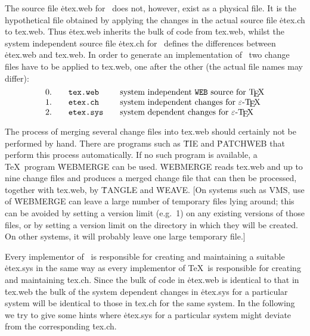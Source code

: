 The source file \.{etex.web} for \eTeX\ does not, however, exist as a
physical file.  It is the hypothetical file obtained by applying the
changes in the actual source file \.{etex.ch} to \.{tex.web}.  Thus
\.{etex.web} inherits the bulk of code from \.{tex.web}, whilst the
system independent source file \.{etex.ch} for \eTeX\ defines the
differences between \.{etex.web} and \.{tex.web}.  In order to generate
an implementation of \eTeX\ two change files have to be applied to
\.{tex.web}, one after the other (the actual file names may differ):
$$
\vcenter{\halign{#\hfil&\qquad\.{#}\hfil&\qquad#\hfil\cr
0.&tex.web&system independent \.{WEB} source for \TeX\cr
1.&etex.ch&system independent changes for \eTeX\cr
2.&etex.sys&system dependent changes for \eTeX\cr
}}
$$

The process of merging several change files into \.{tex.web} should
certainly not be performed by hand.  There are programs such as \.{TIE}
and \.{PATCHWEB} that perform this process automatically.  If no such
program is available, a \TeX\ program \.{WEBMERGE} can be used.
\.{WEBMERGE} reads \.{tex.web} and up to nine change files and produces
a merged change file that can then be processed, together with
\.{tex.web}, by \.{TANGLE} and \.{WEAVE}.  [On systems such as VMS, use
of \.{WEBMERGE} can leave a large number of temporary files
lying around; this can be avoided by setting a version limit (e.g.~1) on any
existing versions of those files, or by setting a version limit on the
directory in which they will be created.  On other systems, it will probably
leave one large temporary file.]

Every implementor of \eTeX\ is responsible for creating and maintaining
a suitable \.{etex.sys} in the same way as every implementor of \TeX\
is responsible for creating and maintaining \.{tex.ch}.  Since the bulk
of code in \.{etex.web} is identical to that in \.{tex.web} the bulk of
the system dependent changes in \.{etex.sys} for a particular system
will be identical to those in \.{tex.ch} for the same system.  In the
following we try to give some hints where \.{etex.sys} for a particular
system might deviate from the corresponding \.{tex.ch}.


